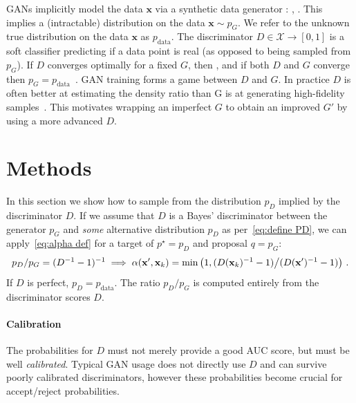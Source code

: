 \documentclass{article}
\renewcommand{\vec}[1]{{\boldsymbol{\mathbf{#1}}}} %
\newcommand{\R}{\mathbb{R}}
\newcommand{\set}[1]{\mathcal{#1}}
\newcommand{\sample}{\sim}
\newcommand{\norm}{\mathcal{N}}
\newcommand{\target}{{p^\star}}
\newcommand{\prop}{q}
\newcommand{\PG}{{p_G}}
\newcommand{\PD}{{p_D}}
\newcommand{\PR}{{p_{\textrm{data}}}}
\newcommand{\accept}{\alpha}
\newcommand{\setx}{\set{X}}
\begin{document}
GANs implicitly model the data $\vec x$ via a synthetic data generator \smash{$G \in \R^{d} \rightarrow \setx$}: \smash{$\vec x = G(\vec z)$}, \smash{$\vec z \sample \norm(\vec 0, \vec I_{d})$}.
This implies a (intractable) distribution on the data $\vec x \sample \PG$.
We refer to the unknown true distribution on the data $\vec x$ as $\PR$.
The discriminator $D \in \setx \rightarrow [0,1]$ is a soft classifier predicting if a data point is real (as opposed to being sampled from $\PG$)\@.
If $D$ converges optimally for a fixed $G$, then \smash{$D = \PR/(\PR + \PG)$}, and if both $D$ and $G$ converge then $\PG = \PR$~\citep{Goodfellow2014}.
GAN training forms a game between $D$ and $G$.
In practice $D$ is often better at estimating the density ratio than G is at generating high-fidelity samples~\citep{Shibuya2017}.
This motivates wrapping an imperfect $G$ to obtain an improved $G'$ by using a more advanced $D$.

\section{Methods}
\label{sec:Methods}

In this section we show how to sample from the distribution $\PD$ implied by the discriminator $D$.
If we assume that $D$ is a Bayes' discriminator between the generator $\PG$ and \emph{some} alternative distribution $\PD$ as per~\eqref{eq:define PD}, we can apply~\eqref{eq:alpha def} for a target of $\target=\PD$ and proposal $\prop=\PG$:
\begin{align}
  \PD/\PG = (D^{-1}-1)^{-1} \implies
  \accept(\vec x', \vec x_k) = \min\left(1, (D(\vec x_k)^{-1} - 1) \middle/ (D(\vec x')^{-1} - 1)\right)\,. \label{eq:alpha from D}
\end{align}
If $D$ is perfect, $\PD = \PR$.
The ratio $\PD/\PG$ is computed entirely from the discriminator scores $D$.

\paragraph{Calibration}
The probabilities for $D$ must not merely provide a good AUC score, but must be well \emph{calibrated}.
Typical GAN usage does not directly use $D$ and can survive poorly calibrated discriminators, however these probabilities become crucial for accept/reject probabilities.
\end{document}
